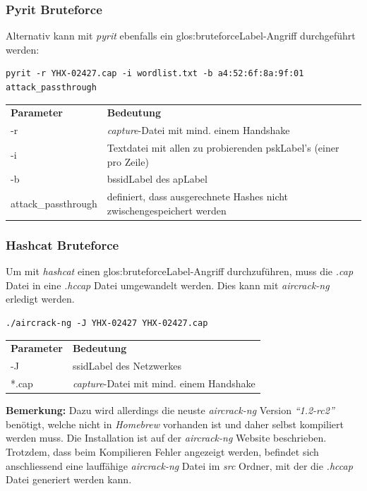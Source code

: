 \subsubsection{Pyrit Bruteforce}
Alternativ kann mit \textit{pyrit} ebenfalls ein \gls{glos:bruteforceLabel}-Angriff durchgeführt werden:
\begin{lstlisting}[style=lstStyleFramed]
pyrit -r YHX-02427.cap -i wordlist.txt -b a4:52:6f:8a:9f:01 attack_passthrough
\end{lstlisting}
\begin{tabular}{l l}
	\textbf{Parameter} & \textbf{Bedeutung}\\
	-r & \textit{capture}-Datei mit mind. einem Handshake\\
	-i	& Textdatei mit allen zu probierenden \gls{pskLabel}'s (einer pro Zeile)\\
	-b	& \gls{bssidLabel} des \gls{apLabel}\\
	attack\_passthrough & definiert, dass ausgerechnete Hashes nicht zwischengespeichert werden\\
\end{tabular}


\subsubsection{Hashcat Bruteforce}
Um mit \textit{hashcat} einen \gls{glos:bruteforceLabel}-Angriff durchzuführen, muss die \textit{.cap} Datei in eine \textit{.hccap} Datei umgewandelt werden. Dies kann mit \textit{aircrack-ng} erledigt werden.

\begin{lstlisting}[style=lstStyleFramed]
./aircrack-ng -J YHX-02427 YHX-02427.cap
\end{lstlisting}
\begin{tabular}{l l}
	\textbf{Parameter} & \textbf{Bedeutung}\\
	-J & \gls{ssidLabel} des Netzwerkes\\
	*.cap & \textit{capture}-Datei mit mind. einem Handshake\\
\end{tabular}

\begin{framed}
	\textbf{Bemerkung:} Dazu wird allerdings die neuste \textit{aircrack-ng} Version \textit{"`1.2-rc2"'} benötigt, welche nicht in \textit{Homebrew} vorhanden ist und daher selbst kompiliert werden muss. Die Installation ist auf der \textit{aircrack-ng} Website beschrieben.\\
	Trotzdem, dass beim Kompilieren Fehler angezeigt werden, befindet sich anschliessend eine lauffähige \textit{aircrack-ng} Datei im \textit{src} Ordner, mit der die \textit{.hccap} Datei generiert werden kann.
\end{framed}

